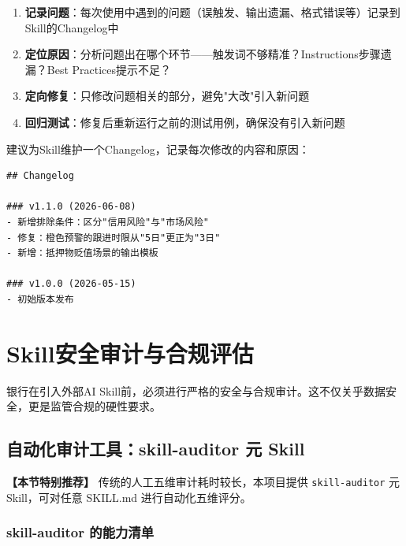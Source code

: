 \begin{practicebox}[Skill迭代优化四步法]
\begin{enumerate}[leftmargin=1em]
  \item \textbf{记录问题}：每次使用中遇到的问题（误触发、输出遗漏、格式错误等）记录到Skill的Changelog中
  \item \textbf{定位原因}：分析问题出在哪个环节——触发词不够精准？Instructions步骤遗漏？Best Practices提示不足？
  \item \textbf{定向修复}：只修改问题相关的部分，避免"大改"引入新问题
  \item \textbf{回归测试}：修复后重新运行之前的测试用例，确保没有引入新问题
\end{enumerate}
\end{practicebox}

\begin{notebox}[版本管理建议]
建议为Skill维护一个Changelog，记录每次修改的内容和原因：
\begin{lstlisting}
## Changelog

### v1.1.0 (2026-06-08)
- 新增排除条件：区分"信用风险"与"市场风险"
- 修复：橙色预警的跟进时限从"5日"更正为"3日"
- 新增：抵押物贬值场景的输出模板

### v1.0.0 (2026-05-15)
- 初始版本发布
\end{lstlisting}
\end{notebox}

\section{Skill安全审计与合规评估}

银行在引入外部AI Skill前，必须进行严格的安全与合规审计。这不仅关乎数据安全，更是监管合规的硬性要求。

\subsection{自动化审计工具：skill-auditor 元 Skill}

\textbf{【本节特别推荐】} 传统的人工五维审计耗时较长，本项目提供 \texttt{skill-auditor} 元 Skill，可对任意 SKILL.md 进行自动化五维评分。

\subsubsection{skill-auditor 的能力清单}

